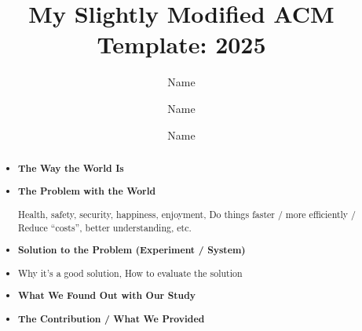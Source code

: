 \documentclass[sigconf, screen, review]{acmart}
\begin{document}

\title[shorty]{My Slightly Modified ACM Template: 2025}

\author{Name}
\author{Name}
\author{Name}

\renewcommand{\shortauthors}{FIRST et al.}

\begin{abstract}
	\begin{itemize}[label={}, leftmargin=0pt,itemsep=0pt, parsep=0pt] %
		\item \textbf{The Way the World Is}
		\item \textbf{The Problem with the World}
		      \par Health, safety, security, happiness, enjoyment, Do things faster / more efficiently / Reduce ``costs'', better understanding, etc.
		\item \textbf{Solution to the Problem (Experiment / System)}
		\item Why it’s a good solution, How to evaluate the solution
		\item \textbf{What We Found Out with Our Study}
		\item \textbf{The Contribution / What We Provided}
	\end{itemize}
\end{abstract}
\end{document}
